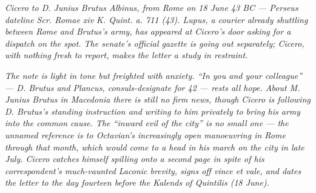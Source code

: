 
\textit{Cicero to D. Junius Brutus Albinus, from Rome on 18
June 43 BC --- Perseus dateline \textit{Scr. Romae xiv K.
Quint. a. 711 (43)}. Lupus, a courier already shuttling
between Rome and Brutus's army, has appeared at Cicero's
door asking for a dispatch on the spot. The senate's
official gazette is going out separately; Cicero, with
nothing fresh to report, makes the letter a study in
restraint.}

\textit{The note is light in tone but freighted with anxiety.
``In you and your colleague'' --- D. Brutus and Plancus,
consuls-designate for 42 --- rests all hope. About M. Junius
Brutus in Macedonia there is still no firm news, though
Cicero is following D. Brutus's standing instruction and
writing to him privately to bring his army into the common
cause. The ``inward evil of the city'' is no small one ---
the unnamed reference is to Octavian's increasingly open
manoeuvring in Rome through that month, which would come
to a head in his march on the city in late July. Cicero
catches himself spilling onto a second page in spite of his
correspondent's much-vaunted Laconic brevity, signs off
\textit{vince et vale}, and dates the letter to the day
fourteen before the Kalends of Quintilis (18 June).}
